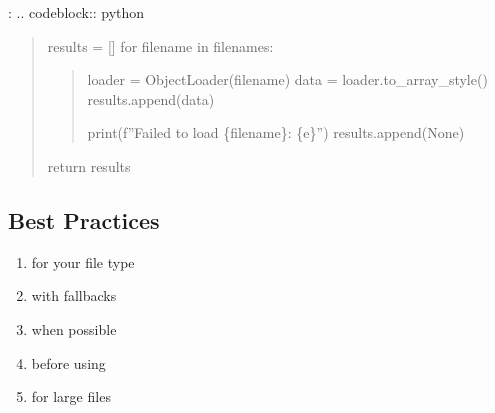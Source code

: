 \documentclass[a4paper,10pt,english,openany,oneside]{sphinxmanual}
\begin{document}
\sphinxAtStartPar
{}:
.. code\sphinxhyphen{}block:: python
\begin{quote}
\begin{description}
\sphinxAtStartPar
results = {[}{]}
for filename in filenames:
\begin{quote}
\begin{description}
\sphinxAtStartPar
loader = ObjectLoader(filename)
data = loader.to\_array\_style()
results.append(data)

\sphinxAtStartPar
print(f”Failed to load \{filename\}: \{e\}”)
results.append(None)

\end{description}
\end{quote}

\sphinxAtStartPar
return results

\end{description}
\end{quote}


\subsection{Best Practices}
\label{\detokenize{api/utils:best-practices}}\begin{enumerate}
%
\item {} 
\sphinxAtStartPar
{} for your file type

\item {} 
\sphinxAtStartPar
{} with fallbacks

\item {} 
\sphinxAtStartPar
{} when possible

\item {} 
\sphinxAtStartPar
{} before using

\item {} 
\sphinxAtStartPar
{} for large files

\end{enumerate}
\end{document}
